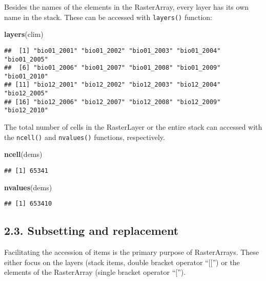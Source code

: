 \documentclass[]{article}
\newenvironment{Shaded}{\begin{snugshade}}{\end{snugshade}}
\newcommand{\KeywordTok}[1]{\textcolor[rgb]{0.13,0.29,0.53}{\textbf{#1}}}
\newcommand{\NormalTok}[1]{#1}
\begin{document}
Besides the names of the elements in the RasterArray, every layer has
its own name in the stack. These can be accessed with \texttt{layers()}
function:

\begin{Shaded}
\begin{Highlighting}[]
\KeywordTok{layers}\NormalTok{(clim)}
\end{Highlighting}
\end{Shaded}

\begin{verbatim}
##  [1] "bio01_2001" "bio01_2002" "bio01_2003" "bio01_2004" "bio01_2005"
##  [6] "bio01_2006" "bio01_2007" "bio01_2008" "bio01_2009" "bio01_2010"
## [11] "bio12_2001" "bio12_2002" "bio12_2003" "bio12_2004" "bio12_2005"
## [16] "bio12_2006" "bio12_2007" "bio12_2008" "bio12_2009" "bio12_2010"
\end{verbatim}

The total number of cells in the RasterLayer or the entire stack can
accessed with the \texttt{ncell()} and \texttt{nvalues()} functions,
respectively.

\begin{Shaded}
\begin{Highlighting}[]
\KeywordTok{ncell}\NormalTok{(dems)}
\end{Highlighting}
\end{Shaded}

\begin{verbatim}
## [1] 65341
\end{verbatim}

\begin{Shaded}
\begin{Highlighting}[]
\KeywordTok{nvalues}\NormalTok{(dems)}
\end{Highlighting}
\end{Shaded}

\begin{verbatim}
## [1] 653410
\end{verbatim}

\subsection{2.3. Subsetting and
replacement}\label{subsetting-and-replacement}

Facilitating the accession of items is the primary purpose of
RasterArrays. These either focus on the layers (stack items, double
bracket operator ``{[}{[}'') or the elements of the RasterArray (single
bracket operator ``{[}'').
\end{document}
